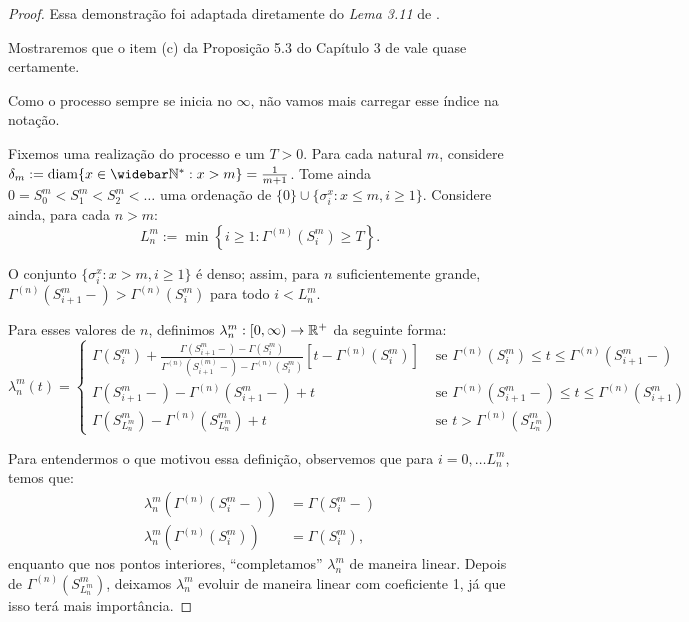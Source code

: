 \begin{proof}
  Essa demonstração foi adaptada diretamente do \emph{Lema 3.11} de
  \cite{fontes:08}.

  Mostraremos que o item (c) da Proposição 5.3 do Capítulo 3 de
  \cite{ethier:86} vale quase certamente.

  Como o processo sempre se inicia no $\infty$, não vamos mais
  carregar esse índice na notação.

  Fixemos uma realização do processo e um $T > 0$. Para cada natural
  $m$, considere $\delta_m := \diam\{ x \in \Nzb: x > m \} =
  \frac{1}{m+1}$. Tome ainda $0 = S_0^m < S_1^m < S_2^m < \ldots $ uma
  ordenação de $\{0\}\cup\{ \sigma^x_i : x \leq m, i \geq
  1\}$. Considere ainda, para cada $n > m$:
  \begin{displaymath}
    L^m_n := \min \left\{ i \geq 1: \Gamma^{(n)}(S^m_i) \geq T \right\}.
  \end{displaymath}

  O conjunto $\{\sigma_i^x: x > m, i\geq 1\}$ é denso; assim, para $n$
  suficientemente grande, $\Gamma^{(n)}(S^m_{i+1}-) >
  \Gamma^{(n)}(S^m_i)$ para todo $i < L^m_n$.

  Para esses valores de $n$, definimos $\lambda_n^m: [0, \infty) \to
  {\mathbb{R}}^+$ da seguinte forma:
  \begin{displaymath}
    \lambda_n^m(t) = \begin{cases}
      \Gamma(S_i^m) + \frac{\Gamma(S_{i+1}^m-) - \Gamma(S_i^m)}
      {\Gamma^{(n)}(S_{i+1}^{(m)} -) - \Gamma^{(n)}(S_i^m)}
      \left[t - \Gamma^{(n)}(S_i^m)\right]
      & \textrm{ se }
      \Gamma^{(n)}(S_i^m) \leq t \leq \Gamma^{(n)}(S_{i+1}^m-) \\
      \Gamma(S_{i+1}^m-) - \Gamma^{(n)}(S_{i+1}^m-) + t
      & \textrm{ se }
      \Gamma^{(n)}(S_{i+1}^m-) \leq t \leq \Gamma^{(n)}(S_{i+1}^m)\\
      \Gamma(S^m_{L_n^m}) - \Gamma^{(n)}(S^m_{L_n^m}) + t
      & \textrm{ se } t > \Gamma^{(n)}(S^m_{L_n^m})
    \end{cases}
  \end{displaymath}

  Para entendermos o que motivou essa definição, observemos que para $i =
  0, \ldots L_n^m$, temos que:
  \begin{align*}
    \lambda_n^m(\Gamma^{(n)}(S_i^m-)) &= \Gamma(S_i^m-)\\
    \lambda_n^m(\Gamma^{(n)}(S_i^m)) &= \Gamma(S_i^m),
  \end{align*}
  enquanto que nos pontos interiores, ``completamos'' $\lambda_n^m$ de
  maneira linear. Depois de $\Gamma^{(n)}(S^m_{L_n^m})$, deixamos
  $\lambda_n^m$ evoluir de maneira linear com coeficiente 1, já que
  isso terá mais importância.


\end{proof}
